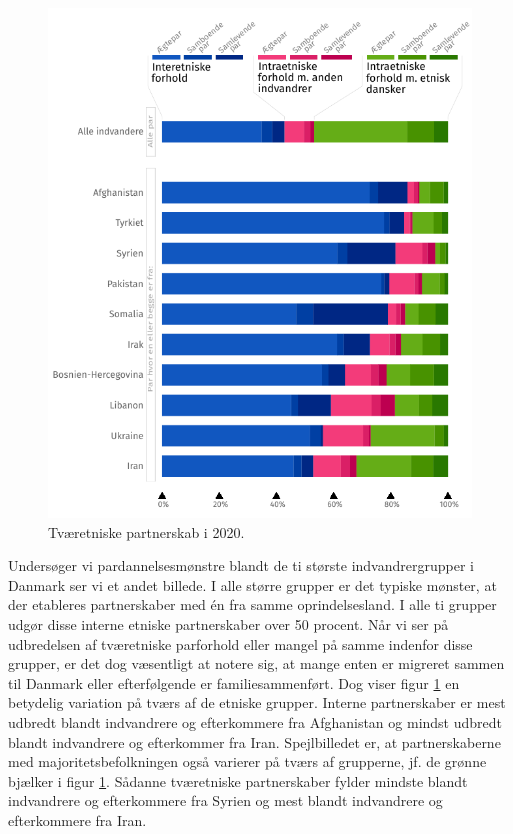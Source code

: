 \documentclass[
]{book}
\begin{document}
\begin{figure}
\includegraphics[width=1\linewidth]{images/figur_intergruppepartnerskaber_2020} \caption{Tværetniske partnerskab i 2020.}\label{fig:fig-2-2}
\end{figure}

Undersøger vi pardannelsesmønstre blandt de ti største indvandrergrupper i Danmark ser vi et andet billede. I alle større grupper er det typiske mønster, at der etableres partnerskaber med én fra samme oprindelsesland. I alle ti grupper udgør disse interne etniske partnerskaber over 50 procent. Når vi ser på udbredelsen af tværetniske parforhold eller mangel på samme indenfor disse grupper, er det dog væsentligt at notere sig, at mange enten er migreret sammen til Danmark eller efterfølgende er familiesammenført. Dog viser figur \ref{fig:fig-2-2} en betydelig variation på tværs af de etniske grupper. Interne partnerskaber er mest udbredt blandt indvandrere og efterkommere fra Afghanistan og mindst udbredt blandt indvandrere og efterkommer fra Iran. Spejlbilledet er, at partnerskaberne med majoritetsbefolkningen også varierer på tværs af grupperne, jf. de grønne bjælker i figur \ref{fig:fig-2-2}. Sådanne tværetniske partnerskaber fylder mindste blandt indvandrere og efterkommere fra Syrien og mest blandt indvandrere og efterkommere fra Iran.
\end{document}
